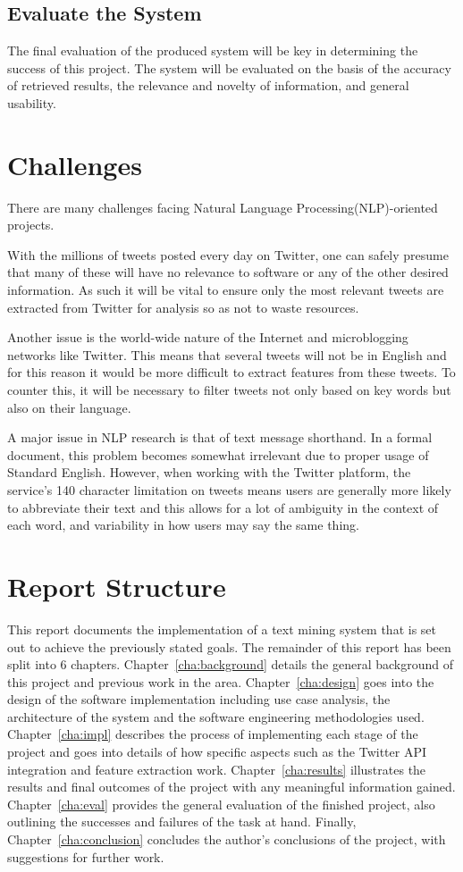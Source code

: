 \subsection{Evaluate the System}
The final evaluation of the produced system will be key in determining the success of this project. The system will be evaluated on the basis of the accuracy of retrieved results, the relevance and novelty of information, and general usability.

\section{Challenges}
There are many challenges facing Natural Language Processing(NLP)-oriented projects.

With the millions of tweets posted every day on Twitter, one can safely presume that many of these will have no relevance to software or any of the other desired information. As such it will be vital to ensure only the most relevant tweets are extracted from Twitter for analysis so as not to waste resources.

Another issue is the world-wide nature of the Internet and microblogging networks like Twitter. This means that several tweets will not be in English and for this reason it would be more difficult to extract features from these tweets. To counter this, it will be necessary to filter tweets not only based on key words but also on their language.

A major issue in NLP research is that of text message shorthand. In a formal document, this problem becomes somewhat irrelevant due to proper usage of Standard English. However, when working with the Twitter platform, the service's 140 character limitation on tweets means users are generally more likely to abbreviate their text and this allows for a lot of ambiguity in the context of each word, and variability in how users may say the same thing.

\section{Report Structure}
This report documents the implementation of a text mining system that is set out to achieve the previously stated goals. The remainder of this report has been split into 6 chapters.
Chapter~\ref{cha:background} details the general background of this project and previous work in the area.
Chapter~\ref{cha:design} goes into the design of the software implementation including use case analysis, the architecture of the system and the software engineering methodologies used.
Chapter~\ref{cha:impl} describes the process of implementing each stage of the project and goes into details of how specific aspects such as the Twitter API integration and feature extraction work.
Chapter~\ref{cha:results} illustrates the results and final outcomes of the project with any meaningful information gained.
Chapter~\ref{cha:eval} provides the general evaluation of the finished project, also outlining the successes and failures of the task at hand.
Finally, Chapter~\ref{cha:conclusion} concludes the author's conclusions of the project, with suggestions for further work.
